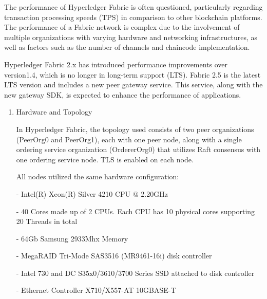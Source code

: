 \documentclass[conference]{IEEEtran}
\begin{document}
\begin{enumerate}[itemsep=2ex, parsep=1ex]
	      The performance of Hyperledger Fabric is often questioned, particularly regarding
	      transaction processing speeds (TPS) in comparison to other blockchain platforms.
	      The performance of a Fabric network is complex due to the involvement of
	      multiple organizations with varying hardware and networking
	      infrastructures, as well as factors such as the number of channels and chaincode
	      implementation.
	      	      	      
	      Hyperledger Fabric 2.x has introduced performance improvements over
	      version1.4, which is no longer in long-term support (LTS). Fabric 2.5 is the
	      latest LTS version and includes a new peer gateway service. This service, along
	      with the new gateway SDK, is expected to enhance the performance of
	      applications.
	      	      	      
	      \begin{enumerate}[itemsep=2ex, parsep=1ex]
	      	\item Hardware and Topology
	      	      	      	      	      	      
	      	      In Hyperledger Fabric, the topology used consists of two peer organizations
	      	      (PeerOrg0 and PeerOrg1), each with one peer node, along with a single ordering
	      	      service organization (OrdererOrg0) that utilizes Raft consensus with one
	      	      ordering service node. TLS is enabled on each node.
	      	      	      	      	      	      
	      	      All nodes utilized the same hardware configuration:
	      	      	      	      	      	      
	      	      - Intel(R) Xeon(R) Silver 4210 CPU @ 2.20GHz
	      	      	      	      	      	      
	      	      - 40 Cores made up of 2 CPUs. Each CPU has 10 physical cores supporting
	      	      20 Threads in total
	      	      	      	      	      	      
	      	      - 64Gb Samsung 2933Mhx Memory
	      	      	      	      	      	      
	      	      - MegaRAID Tri-Mode SAS3516 (MR9461-16i) disk controller
	      	      	      	      	      	      
	      	      - Intel 730 and DC S35x0/3610/3700 Series SSD attached to disk
	      	      controller
	      	      	      	      	      	      
	      	      - Ethernet Controller X710/X557-AT 10GBASE-T
	      	      	      	      	      	      

\end{enumerate}
\end{enumerate}
\end{document}
